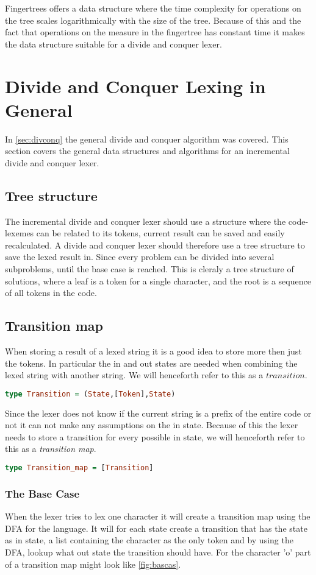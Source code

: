 Fingertrees offers a data structure where the time complexity for operations on
the tree scales logarithmically with the size of the tree. Because of this and
the fact that operations on the measure in the fingertree has constant time it
makes the data structure suitable for a divide and conquer lexer.

\section{Divide and Conquer Lexing in General}
In \cref{sec:divconq} the general divide and conquer algorithm was covered. This
section covers the general data structures and algorithms for an incremental
divide and conquer lexer.

\subsection{Tree structure}
The incremental divide and conquer lexer should use a structure where the
code-lexemes can be related to its tokens, current result can be saved and
easily recalculated. A divide and conquer lexer should therefore use a tree
structure to save the lexed result in. Since every problem can be divided into
several subproblems, until the base case is reached. This is cleraly a tree
structure of solutions, where a leaf is a token for a single character, and the
root is a sequence of all tokens in the code.  

\subsection{Transition map}
When storing a result of a lexed string it is a good idea to store more then
just the tokens. In particular the in and out states are needed when combining
the lexed string with another string. We will henceforth refer to this as a
$transition$.
\begin{lstlisting}[language=Haskell]
type Transition = (State,[Token],State)
\end{lstlisting}
Since the lexer does not know if the current string is a prefix of the entire
code or not it can not make any assumptions on the in state. Because of this the
lexer needs to store a transition for every possible in state, we will henceforth
refer to this as a \emph{transition map}.
\begin{lstlisting}[language=Haskell]
type Transition_map = [Transition]
\end{lstlisting}
\subsubsection{The Base Case}
When the lexer tries to lex one character it will create a transition
map using the DFA for the language. It will for each state create a transition
that has the state as in state, a list containing the character as the only
token and by using the DFA, lookup what out state the transition should have.
For the character 'o' part of a transition map might look like \cref{fig:bascas}.

